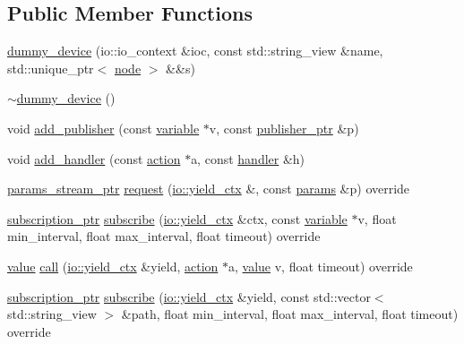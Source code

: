 \subsection*{Public Member Functions}
\begin{DoxyCompactItemize}
\item 
\hyperlink{classtelegraph_1_1dummy__device_a70f00acd6141dea4c68f3b1f51c06cf0}{dummy\+\_\+device} (io\+::io\+\_\+context \&ioc, const std\+::string\+\_\+view \&name, std\+::unique\+\_\+ptr$<$ \hyperlink{classtelegraph_1_1node}{node} $>$ \&\&s)
\item 
\hyperlink{classtelegraph_1_1dummy__device_a7c2ea565d75451d04eaaba128be2550a}{$\sim$dummy\+\_\+device} ()
\item 
void \hyperlink{classtelegraph_1_1dummy__device_a577a558745fcfddca641a80390ced80d}{add\+\_\+publisher} (const \hyperlink{classtelegraph_1_1variable}{variable} $\ast$v, const \hyperlink{namespacetelegraph_aff5109352406dd9a8cd38f431f808bc5}{publisher\+\_\+ptr} \&p)
\item 
void \hyperlink{classtelegraph_1_1dummy__device_abf7bb4171f3bc0af89101f12a885d614}{add\+\_\+handler} (const \hyperlink{classtelegraph_1_1action}{action} $\ast$a, const \hyperlink{classtelegraph_1_1dummy__device_a608031386eb0abf2fc578211c1270f89}{handler} \&h)
\item 
\hyperlink{namespacetelegraph_ad071241508ea0f86c7de0686016f9ca9}{params\+\_\+stream\+\_\+ptr} \hyperlink{classtelegraph_1_1dummy__device_a46d728506b36e9e8b5b6939eb6aefe12}{request} (\hyperlink{structboost_1_1asio_1_1yield__ctx}{io\+::yield\+\_\+ctx} \&, const \hyperlink{classtelegraph_1_1params}{params} \&p) override
\item 
\hyperlink{namespacetelegraph_a58641aa5b1a2cbdb0431916a87069f64}{subscription\+\_\+ptr} \hyperlink{classtelegraph_1_1dummy__device_a06470ed069c481e8199dce9387448c8b}{subscribe} (\hyperlink{structboost_1_1asio_1_1yield__ctx}{io\+::yield\+\_\+ctx} \&ctx, const \hyperlink{classtelegraph_1_1variable}{variable} $\ast$v, float min\+\_\+interval, float max\+\_\+interval, float timeout) override
\item 
\hyperlink{classtelegraph_1_1value}{value} \hyperlink{classtelegraph_1_1dummy__device_af2e3be5731809d7693cb6a4607e5e3f6}{call} (\hyperlink{structboost_1_1asio_1_1yield__ctx}{io\+::yield\+\_\+ctx} \&yield, \hyperlink{classtelegraph_1_1action}{action} $\ast$a, \hyperlink{classtelegraph_1_1value}{value} v, float timeout) override
\item 
\hyperlink{namespacetelegraph_a58641aa5b1a2cbdb0431916a87069f64}{subscription\+\_\+ptr} \hyperlink{classtelegraph_1_1dummy__device_a8996ac06dfc98de11c3d156b4a0a2caf}{subscribe} (\hyperlink{structboost_1_1asio_1_1yield__ctx}{io\+::yield\+\_\+ctx} \&yield, const std\+::vector$<$ std\+::string\+\_\+view $>$ \&path, float min\+\_\+interval, float max\+\_\+interval, float timeout) override

\end{DoxyCompactItemize}
